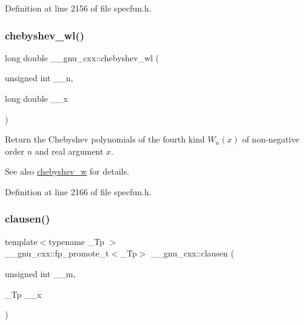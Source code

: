 Definition at line 2156 of file specfun.\+h.

\mbox{\label{group__gnu__math__spec__func_ga1297dfd9b9a0f584435de7d83eb9e9c3}} 
\subsubsection{\texorpdfstring{chebyshev\+\_\+wl()}{chebyshev\_wl()}}
{\footnotesize\ttfamily long double \+\_\+\+\_\+gnu\+\_\+cxx\+::chebyshev\+\_\+wl (\begin{DoxyParamCaption}\item[{unsigned int}]{\+\_\+\+\_\+n,  }\item[{long double}]{\+\_\+\+\_\+x }\end{DoxyParamCaption})\hspace{0.3cm}{\ttfamily [inline]}}

Return the Chebyshev polynomials of the fourth kind $ W_n(x) $ of non-\/negative order $ n $ and real argument $ x $.

\begin{DoxySeeAlso}{See also}
\hyperlink{group__gnu__math__spec__func_gaa156c6c21e99104ebcb627e92aceada0}{chebyshev\+\_\+w} for details. 
\end{DoxySeeAlso}


Definition at line 2166 of file specfun.\+h.

\mbox{\label{group__gnu__math__spec__func_ga54e4ba71b1f81718d6998349f91ff88f}} 
\subsubsection{\texorpdfstring{clausen()}{clausen()}\hspace{0.1cm}{\footnotesize\ttfamily [1/2]}}
{\footnotesize\ttfamily template$<$typename \+\_\+\+Tp $>$ \\
\+\_\+\+\_\+gnu\+\_\+cxx\+::fp\+\_\+promote\+\_\+t$<$\+\_\+\+Tp$>$ \+\_\+\+\_\+gnu\+\_\+cxx\+::clausen (\begin{DoxyParamCaption}\item[{unsigned int}]{\+\_\+\+\_\+m,  }\item[{\+\_\+\+Tp}]{\+\_\+\+\_\+x }\end{DoxyParamCaption})\hspace{0.3cm}{\ttfamily [inline]}}

